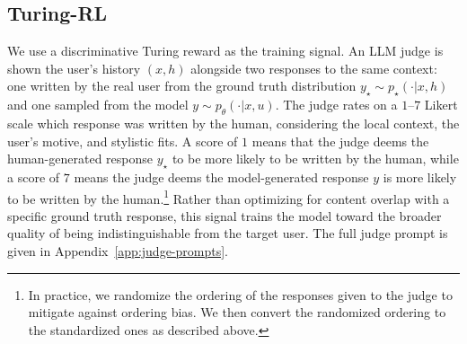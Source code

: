 \documentclass{article} %
\begin{document}


\subsection{Turing-RL}\label{sec:training}
We use a discriminative Turing reward as the training signal. An LLM judge is shown the user's  history $(x, h)$ alongside two responses to the same context: one written by the real user from the ground truth distribution $y_{\star} \sim p_\star(\cdot | x,h)$ and one sampled from the model $y \sim p_\theta( \cdot | x, u )$. The judge rates on a $1$--$7$ Likert scale which response was written by the human, considering the local context, the user's motive, and stylistic fits. A score of $1$ means that the judge deems the human-generated response $y_{\star}$ to be more likely to be written by the human, while a score of $7$ means the judge deems the model-generated response $y$ is more likely to be written by the human.\footnote{In practice, we randomize the ordering of the responses given to the judge to mitigate against ordering bias. We then convert the randomized ordering to the standardized ones as described above.} Rather than optimizing for content overlap with a specific ground truth response, this signal trains the model toward the broader quality of being indistinguishable from the target user. The full judge prompt is given in Appendix~\ref{app:judge-prompts}.
\end{document}
